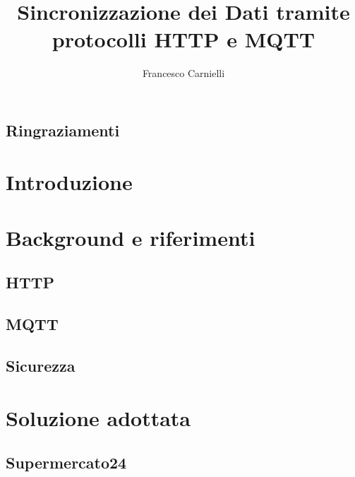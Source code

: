 \documentclass[a4paper, 12pt] {report}
\title{Sincronizzazione dei Dati tramite protocolli HTTP e MQTT}
\author{Francesco Carnielli}
\date{}
\begin{document}
\maketitle

\newpage
\thispagestyle{empty}
\mbox{}

\newpage
\thispagestyle{empty}
\mbox{}

\section*{Ringraziamenti}


\newpage
\thispagestyle{empty}
\mbox{}

\tableofcontents
\newpage

\clearpage
{}
\setcounter{page}{1}

\chapter{Introduzione}


\newpage
\thispagestyle{empty}
\mbox{}

\chapter{Background e riferimenti}

\section{HTTP}

\section{MQTT}

\section{Sicurezza}


\newpage
\thispagestyle{empty}
\mbox{}

\chapter{Soluzione adottata}

\section{Supermercato24}

\end{document}
